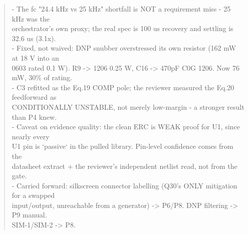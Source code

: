 \documentclass[11pt,a4paper]{article}
\begin{document}
\begin{quote}
- The fc "24.4 kHz vs 25 kHz" shortfall is NOT a requirement miss - 25 kHz was the\\
  orchestrator's own proxy; the real spec is 100 us recovery and settling is 32.6 us (3.1x).\\
- Fixed, not waived: DNP snubber overstressed its own resistor (162 mW at 18 V into an\\
  0603 rated 0.1 W). R9 -\textgreater{} 1206 0.25 W, C16 -\textgreater{} 470pF C0G 1206. Now 76 mW, 30\% of rating.\\
- C3 refitted as the Eq.19 COMP pole; the reviewer measured the Eq.20 feedforward as\\
  CONDITIONALLY UNSTABLE, not merely low-margin - a stronger result than P4 knew.\\
- Caveat on evidence quality: the clean ERC is WEAK proof for U1, since nearly every\\
  U1 pin is `passive` in the pulled library. Pin-level confidence comes from the\\
  datasheet extract + the reviewer's independent netlist read, not from the gate.\\
- Carried forward: silkscreen connector labelling (Q30's ONLY mitigation for a swapped\\
  input/output, unreachable from a generator) -\textgreater{} P6/P8. DNP filtering -\textgreater{} P9 manual.\\
  SIM-1/SIM-2 -\textgreater{} P8.
\end{quote}
\end{document}
